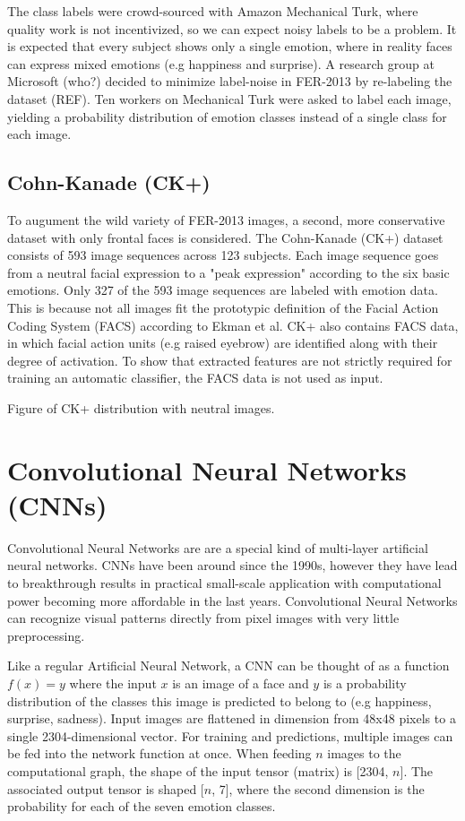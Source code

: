 \documentclass[twoside]{article}
\begin{document}
\begin{multicols}{2}
The class labels were crowd-sourced with Amazon Mechanical Turk, where quality work is not incentivized, so we can expect noisy labels to be a problem. It is expected that every subject shows only a single emotion, where in reality faces can express mixed emotions (e.g happiness and surprise). A research group at Microsoft (who?) decided to minimize label-noise in FER-2013 by re-labeling the dataset (REF). Ten workers on Mechanical Turk were asked to label each image, yielding a probability distribution of emotion classes instead of a single class for each image.


\subsection{Cohn-Kanade (CK+)}
To augument the wild variety of FER-2013 images, a second, more conservative dataset with only frontal faces is considered. The Cohn-Kanade (CK+) dataset consists of 593 image sequences across 123 subjects. Each image sequence goes from a neutral facial expression to a "peak expression" according to the six basic emotions. Only 327 of the 593 image sequences are labeled with emotion data. This is because not all images fit the prototypic definition of the Facial Action Coding System (FACS) according to Ekman et al. CK+ also contains FACS data, in which facial action units (e.g raised eyebrow) are identified along with their degree of activation. To show that extracted features are not strictly required for training an automatic classifier, the FACS data is not used as input.

Figure of CK+ distribution with neutral images.


\section{Convolutional Neural Networks (CNNs)}
Convolutional Neural Networks are are a special kind of multi-layer artificial neural networks. CNNs have been around since the 1990s, however they have lead to breakthrough results in practical small-scale application with computational power becoming more affordable in the last years. Convolutional Neural Networks can recognize visual patterns directly from pixel images with very little preprocessing. 

Like a regular Artificial Neural Network, a CNN can be thought of as a function $f(x) = y$ where the input $x$ is an image of a face and $y$ is a probability distribution of the classes this image is predicted to belong to (e.g happiness, surprise, sadness). Input images are flattened in dimension from 48x48 pixels to a single 2304-dimensional vector. For training and predictions, multiple images can be fed into the network function at once. When feeding $n$ images to the computational graph, the shape of the input tensor (matrix) is [2304, $n$]. The associated output tensor is shaped [$n$, 7], where the second dimension is the probability for each of the seven emotion classes.


\end{multicols}
\end{document}

